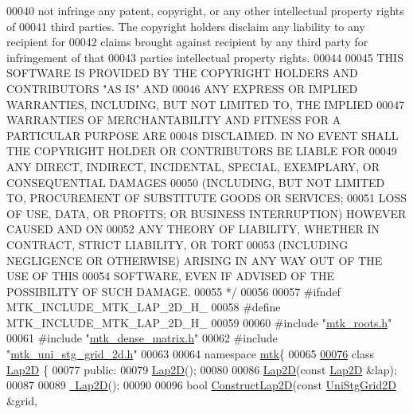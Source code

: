 \begin{DoxyCode}
00040 \textcolor{comment}{not infringe any patent, copyright, or any other intellectual property rights of}
00041 \textcolor{comment}{third parties. The copyright holders disclaim any liability to any recipient for}
00042 \textcolor{comment}{claims brought against recipient by any third party for infringement of that}
00043 \textcolor{comment}{parties intellectual property rights.}
00044 \textcolor{comment}{}
00045 \textcolor{comment}{THIS SOFTWARE IS PROVIDED BY THE COPYRIGHT HOLDERS AND CONTRIBUTORS "AS IS" AND}
00046 \textcolor{comment}{ANY EXPRESS OR IMPLIED WARRANTIES, INCLUDING, BUT NOT LIMITED TO, THE IMPLIED}
00047 \textcolor{comment}{WARRANTIES OF MERCHANTABILITY AND FITNESS FOR A PARTICULAR PURPOSE ARE}
00048 \textcolor{comment}{DISCLAIMED. IN NO EVENT SHALL THE COPYRIGHT HOLDER OR CONTRIBUTORS BE LIABLE FOR}
00049 \textcolor{comment}{ANY DIRECT, INDIRECT, INCIDENTAL, SPECIAL, EXEMPLARY, OR CONSEQUENTIAL DAMAGES}
00050 \textcolor{comment}{(INCLUDING, BUT NOT LIMITED TO, PROCUREMENT OF SUBSTITUTE GOODS OR SERVICES;}
00051 \textcolor{comment}{LOSS OF USE, DATA, OR PROFITS; OR BUSINESS INTERRUPTION) HOWEVER CAUSED AND ON}
00052 \textcolor{comment}{ANY THEORY OF LIABILITY, WHETHER IN CONTRACT, STRICT LIABILITY, OR TORT}
00053 \textcolor{comment}{(INCLUDING NEGLIGENCE OR OTHERWISE) ARISING IN ANY WAY OUT OF THE USE OF THIS}
00054 \textcolor{comment}{SOFTWARE, EVEN IF ADVISED OF THE POSSIBILITY OF SUCH DAMAGE.}
00055 \textcolor{comment}{*/}
00056 
00057 \textcolor{preprocessor}{#ifndef MTK\_INCLUDE\_MTK\_LAP\_2D\_H\_}
00058 \textcolor{preprocessor}{#define MTK\_INCLUDE\_MTK\_LAP\_2D\_H\_}
00059 
00060 \textcolor{preprocessor}{#include "\hyperlink{mtk__roots_8h}{mtk\_roots.h}"}
00061 \textcolor{preprocessor}{#include "\hyperlink{mtk__dense__matrix_8h}{mtk\_dense\_matrix.h}"}
00062 \textcolor{preprocessor}{#include "\hyperlink{mtk__uni__stg__grid__2d_8h}{mtk\_uni\_stg\_grid\_2d.h}"}
00063 
00064 \textcolor{keyword}{namespace }\hyperlink{namespacemtk}{mtk}\{
00065 
\hypertarget{mtk__lap__2d_8h_source_l00076}{}\hyperlink{classmtk_1_1Lap2D}{00076} \textcolor{keyword}{class }\hyperlink{classmtk_1_1Lap2D}{Lap2D} \{
00077  \textcolor{keyword}{public}:
00079   \hyperlink{classmtk_1_1Lap2D_ada4370fb8d7726e70a3257e3841c6d1f}{Lap2D}();
00080 
00086   \hyperlink{classmtk_1_1Lap2D_ada4370fb8d7726e70a3257e3841c6d1f}{Lap2D}(\textcolor{keyword}{const} \hyperlink{classmtk_1_1Lap2D}{Lap2D} &lap);
00087 
00089   \hyperlink{classmtk_1_1Lap2D_a8ca8447a4da7a5ddcf826486992374a5}{~Lap2D}();
00090 
00096   \textcolor{keywordtype}{bool} \hyperlink{classmtk_1_1Lap2D_a188ee8fee643463affca7de2884711b1}{ConstructLap2D}(\textcolor{keyword}{const} \hyperlink{classmtk_1_1UniStgGrid2D}{UniStgGrid2D} &grid,

\end{DoxyCode}
